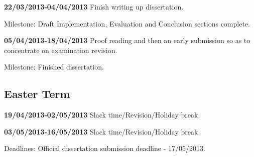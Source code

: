 {\bf 22/03/2013-04/04/2013} Finish writing up dissertation.

Milestone: Draft Implementation, Evaluation and Conclusion sections complete.

{\bf 05/04/2013-18/04/2013} Proof reading and then an early submission so as to concentrate on
examination revision.

Milestone: Finished dissertation.

\subsection*{Easter Term}
{\bf 19/04/2013-02/05/2013} Slack time/Revision/Holiday break.

{\bf 03/05/2013-16/05/2013} Slack time/Revision/Holiday break.

Deadlines: Official dissertation submission deadline - 17/05/2013.
